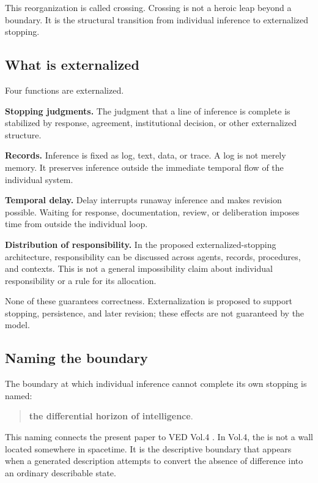 This reorganization is called crossing. Crossing is not a heroic leap beyond a boundary. It is the structural transition from individual inference to externalized stopping.

\subsection{What is externalized}

Four functions are externalized.

\textbf{Stopping judgments.}
The judgment that a line of inference is complete is stabilized by response, agreement, institutional decision, or other externalized structure.

\textbf{Records.}
Inference is fixed as log, text, data, or trace. A log is not merely memory. It preserves inference outside the immediate temporal flow of the individual system.

\textbf{Temporal delay.}
Delay interrupts runaway inference and makes revision possible. Waiting for response, documentation, review, or deliberation imposes time from outside the individual loop.

\textbf{Distribution of responsibility.}
In the proposed externalized-stopping architecture, responsibility can be discussed across agents, records, procedures, and contexts. This is not a general impossibility claim about individual responsibility or a rule for its allocation.

None of these guarantees correctness. Externalization is proposed to support stopping, persistence, and later revision; these effects are not guaranteed by the model.

\subsection{Naming the boundary}

The boundary at which individual inference cannot complete its own stopping is named:

\begin{quote}
\textbf{the differential horizon of intelligence}.
\end{quote}

This naming connects the present paper to VED Vol.4 \citep{VEDVol4}. In Vol.4, the \DH{} is not a wall located somewhere in spacetime. It is the descriptive boundary that appears when a generated description attempts to convert the absence of difference into an ordinary describable state.


